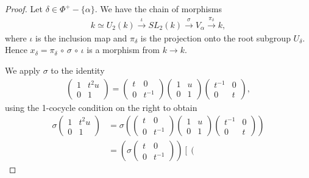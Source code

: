 \begin{proof}
Let $\delta \in \Phi^+-\{\alpha\}$. We have the chain of morphisms
\begin{align*}
k\simeq U_2(k) 
\stackrel{\iota}\longrightarrow SL_2(k) 
\stackrel{\sigma}\longrightarrow V_\alpha 
\stackrel{\pi_\delta}\longrightarrow k,
\end{align*}
where $\iota$ is the inclusion map and $\pi_\delta$ is the projection onto the root subgroup $U_\delta$. Hence  $x_\delta = \pi_\delta\, \circ\, \sigma\, \circ\, \iota$ is a morphism from $k \rightarrow k$.

We apply $\sigma$ to the identity
\begin{align*}
\left(\begin{matrix}
1 & t^2u \\ 0 & 1
\end{matrix}\right) =
\left(\begin{matrix}
t & 0 \\ 0 & t^{-1}
\end{matrix}\right)
\left(\begin{matrix}
1 & u \\ 0 & 1
\end{matrix}\right)
\left(\begin{matrix}
t^{-1} & 0 \\ 0 & t
\end{matrix}\right),
\end{align*}
using the 1-cocycle condition on the right to obtain
\begin{align}
\sigma
\left(\begin{matrix}
1 & t^2u \\ 0 & 1
\end{matrix}\right)
&=\sigma\left(
\left(\begin{matrix}
t & 0 \\ 0 & t^{-1}
\end{matrix}\right)
\left(\begin{matrix}
1 & u \\ 0 & 1
\end{matrix}\right)
\left(\begin{matrix}
t^{-1} & 0 \\ 0 & t
\end{matrix}\right)
\right) \nonumber \\
&=
\left(\sigma
\left(\begin{matrix}
t & 0 \\ 0 & t^{-1}
\end{matrix}\right)
\right)\left[
\left(\begin{matrix}

\end{matrix}
\end{align}
\end{proof}
